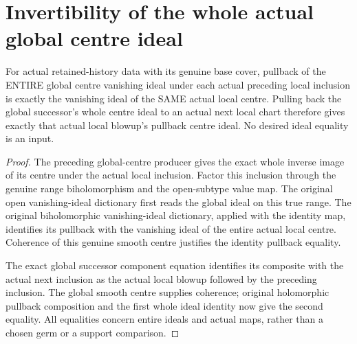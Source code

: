 \section{Invertibility of the whole actual global centre ideal}

\begin{theorem}
\label{hir:sharp-actual-curve-successor-centre-local-ideal}
\leanok
For actual retained-history data with its genuine base cover, pullback of
the ENTIRE global centre vanishing ideal under each actual preceding
local inclusion is exactly the vanishing ideal of the SAME actual local
centre. Pulling back the global successor's whole centre ideal to an
actual next local chart therefore gives exactly that actual local
blowup's pullback centre ideal. No desired ideal equality is an input.
\end{theorem}
\begin{proof}
The preceding global-centre producer gives the exact whole inverse image
of its centre under the actual local inclusion. Factor this inclusion
through the genuine range biholomorphism and the open-subtype value map.
The original open vanishing-ideal dictionary first reads the global ideal
on this true range. The original biholomorphic vanishing-ideal dictionary,
applied with the identity map, identifies its pullback with the vanishing
ideal of the entire actual local centre. Coherence of this genuine smooth
centre justifies the identity pullback equality.

The exact global successor component equation identifies its composite
with the actual next inclusion as the actual local blowup followed by
the preceding inclusion. The global smooth centre supplies coherence;
original holomorphic pullback composition and the first whole ideal
identity now give the second equality. All equalities concern entire
ideals and actual maps, rather than a chosen germ or a support comparison.
\end{proof}

